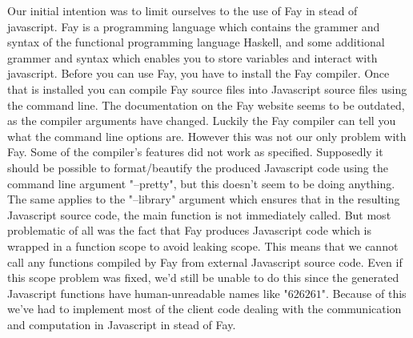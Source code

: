 Our initial intention was to limit ourselves to the use of Fay \cite{Fay} in
stead of javascript. Fay is a programming language which contains the grammer
and syntax of the functional programming language Haskell, and some additional
grammer and syntax which enables you to store variables and interact with
javascript. Before you can use Fay, you have to install the Fay compiler. Once
that is installed you can compile Fay source files into Javascript source files
using the command line. The documentation on the Fay website seems to be
outdated, as the compiler arguments have changed. Luckily the Fay compiler can
tell you what the command line options are. However this was not our only
problem with Fay. Some of the compiler's features did not work as specified.
Supposedly it should be possible to format/beautify the produced Javascript code
using the command line argument "--pretty", but this doesn't seem to be doing
anything. The same applies to the "--library" argument which ensures that in the
resulting Javascript source code, the main function is not immediately called.
But most problematic of all was the fact that Fay produces Javascript code which
is wrapped in a function scope to avoid leaking scope. This means that we cannot
call any functions compiled by Fay from external Javascript source code. Even if
this scope problem was fixed, we'd still be unable to do this since the
generated Javascript functions have human-unreadable names like "$62$$62$$61$".
Because of this we've had to implement most of the client code dealing with the
communication and computation in Javascript in stead of Fay.
